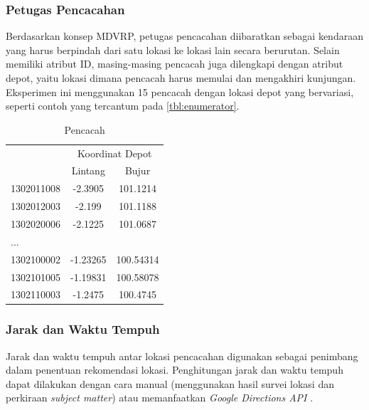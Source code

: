 \subsubsection{Petugas Pencacahan}
Berdasarkan konsep MDVRP, petugas pencacahan diibaratkan sebagai kendaraan yang harus berpindah dari satu lokasi ke lokasi lain secara berurutan. Selain memiliki atribut ID, masing-masing pencacah juga dilengkapi dengan atribut depot, yaitu lokasi dimana pencacah harus memulai dan mengakhiri kunjungan. Eksperimen ini menggunakan 15 pencacah dengan lokasi depot yang bervariasi, seperti contoh yang tercantum pada \autoref{tbl:enumerator}.


\begin{table}[!]
	\centering
	\caption{Pencacah}
	\label{tbl:enumerator}
	\begin{tabular}{lcc}
		\toprule
		& \multicolumn{2}{c}{Koordinat Depot}\\
		\cmidrule{2-3}
		& Lintang & Bujur\\ 
		\midrule
		1302011008 & -2.3905 & 101.1214\\
		1302012003 & -2.199 & 101.1188\\
		1302020006 & -2.1225 & 101.0687\\
		...\\
		1302100002 & -1.23265 & 100.54314\\
		1302101005 & -1.19831 & 100.58078\\
		1302110003 & -1.2475 & 100.4745\\
		\bottomrule
	\end{tabular}
\end{table}


\subsubsection{Jarak dan Waktu Tempuh}
\label{ss:distance-duration-matrix}
Jarak dan waktu tempuh antar lokasi pencacahan digunakan sebagai penimbang dalam penentuan rekomendasi lokasi. Penghitungan jarak dan waktu tempuh dapat dilakukan dengan cara manual (menggunakan hasil survei lokasi dan perkiraan \textit{subject matter}) atau memanfaatkan \textit{Google Directions API} \citep{google_google_2016}. 


